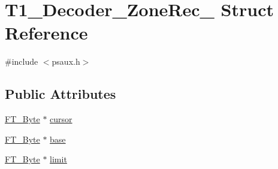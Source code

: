 \hypertarget{struct_t1___decoder___zone_rec__}{\section{T1\-\_\-\-Decoder\-\_\-\-Zone\-Rec\-\_\- Struct Reference}
\label{struct_t1___decoder___zone_rec__}
}


{\ttfamily \#include $<$psaux.\-h$>$}

\subsection*{Public Attributes}
\begin{DoxyCompactItemize}
\item 
\hyperlink{fttypes_8h_a51f26183ca0c9f4af958939648caeccd}{F\-T\-\_\-\-Byte} $\ast$ \hyperlink{struct_t1___decoder___zone_rec___a14e9f190496672f6174ead91e375767d}{cursor}
\item 
\hyperlink{fttypes_8h_a51f26183ca0c9f4af958939648caeccd}{F\-T\-\_\-\-Byte} $\ast$ \hyperlink{struct_t1___decoder___zone_rec___a9cd7e54387b238504b1e8aae47b7da7c}{base}
\item 
\hyperlink{fttypes_8h_a51f26183ca0c9f4af958939648caeccd}{F\-T\-\_\-\-Byte} $\ast$ \hyperlink{struct_t1___decoder___zone_rec___a46fe1e4aa9bdb712ae414305f88d95db}{limit}
\end{DoxyCompactItemize}


